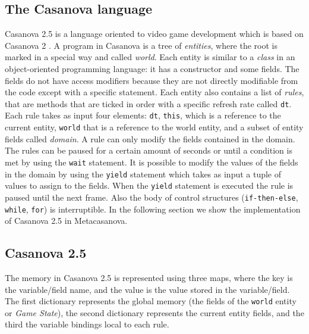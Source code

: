 \subsection{The Casanova language}
Casanova 2.5 is a language oriented to video game development which is based on Casanova 2 \cite{CASANOVA2_PAPER}. A program in Casanova is a tree of \textit{entities}, where the root is marked in a special way and called \textit{world}. Each entity is similar to a \textit{class} in an object-oriented programming language: it has a constructor and some fields. The fields do not have access modifiers because they are not directly modifiable from the code except with a specific statement. Each entity also contains a list of \textit{rules}, that are methods that are ticked in order with a specific refresh rate called \texttt{dt}. Each rule takes as input four elements: \texttt{dt}, \texttt{this}, which is a reference to the current entity, \texttt{world} that is a reference to the world entity, and a subset of entity fields called \textit{domain}. A rule can only modify the fields contained in the domain. The rules can be paused for a certain amount of seconds or until a condition is met by using the \texttt{wait} statement. It is possible to modify the values of the fields in the domain by using the \texttt{yield} statement which takes as input a tuple of values to assign to the fields. When the \texttt{yield} statement is executed the rule is paused until the next frame. Also the body of control structures (\texttt{if-then-else}, \texttt{while}, \texttt{for}) is interruptible. In the following section we show the implementation of Casanova 2.5 in Metacasanova.

\subsection{Casanova 2.5}
The memory in Casanova 2.5 is represented using three maps, where the key is the variable/field name, and the value is the value stored in the variable/field. The first dictionary represents the global memory (the fields of the \texttt{world} entity or \textit{Game State}), the second dictionary represents the current entity fields, and the third the variable bindings local to each rule.

